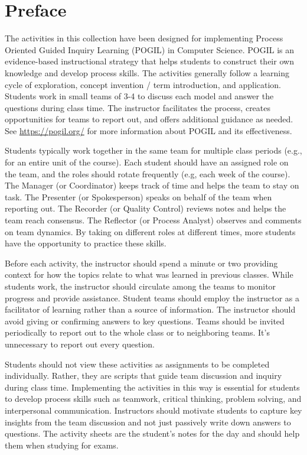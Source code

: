 \chapter*{Preface}
\thispagestyle{empty}

The activities in this collection have been designed for implementing Process Oriented Guided Inquiry Learning (POGIL) in Computer Science. POGIL is an evidence-based instructional strategy that helps students to construct their own knowledge and develop process skills. The activities generally follow a learning cycle of exploration, concept invention / term introduction, and application. Students work in small teams of 3-4 to discuss each model and answer the questions during class time. The instructor facilitates the process, creates opportunities for teams to report out, and offers additional guidance as needed. See \url{https://pogil.org/} for more information about POGIL and its effectiveness.

\bigskip

Students typically work together in the same team for multiple class periods (e.g., for an entire unit of the course). Each student should have an assigned role on the team, and the roles should rotate frequently (e.g, each week of the course). The Manager (or Coordinator) keeps track of time and helps the team to stay on task. The Presenter (or Spokesperson) speaks on behalf of the team when reporting out. The Recorder (or Quality Control) reviews notes and helps the team reach consensus. The Reflector (or Process Analyst) observes and comments on team dynamics. By taking on different roles at different times, more students have the opportunity to practice these skills.

\bigskip

Before each activity, the instructor should spend a minute or two providing context for how the topics relate to what was learned in previous classes. While students work, the instructor should circulate among the teams to monitor progress and provide assistance. Student teams should employ the instructor as a facilitator of learning rather than a source of information. The instructor should avoid giving or confirming answers to key questions. Teams should be invited periodically to report out to the whole class or to neighboring teams. It's unnecessary to report out every question.

\bigskip

Students should not view these activities as assignments to be completed individually. Rather, they are scripts that guide team discussion and inquiry during class time. Implementing the activities in this way is essential for students to develop process skills such as teamwork, critical thinking, problem solving, and interpersonal communication. Instructors should motivate students to capture key insights from the team discussion and not just passively write down answers to questions. The activity sheets are the student's notes for the day and should help them when studying for exams.

